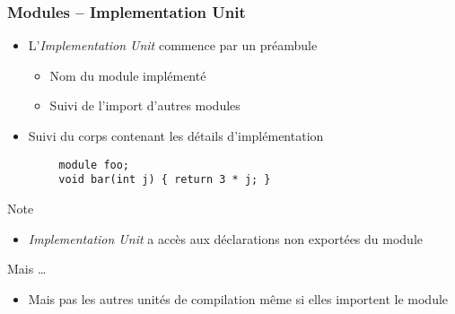\documentclass[C++.tex]{subfiles}
\begin{document}
\begin{frame}[fragile]
	\frametitle{Modules -- Implementation Unit}
	\begin{itemize}
		\item L'\textit{Implementation Unit} commence par un préambule
		\begin{itemize}
			\item Nom du module implémenté
			\item Suivi de l'import d'autres modules
		\end{itemize}
		\item Suivi du corps contenant les détails d'implémentation
	\end{itemize}

	\begin{verbatim}
		module foo;
		void bar(int j) { return 3 * j; }
	\end{verbatim}

	\begin{block}{Note}
		\begin{itemize}
			\item \textit{Implementation Unit} a accès aux déclarations non exportées du module
		\end{itemize}

	\end{block}

	\begin{alertblock}{Mais \ldots{}}
		\begin{itemize}
			\item Mais pas les autres unités de compilation même si elles importent le module
		\end{itemize}
	\end{alertblock}
\end{frame}
\end{document}
